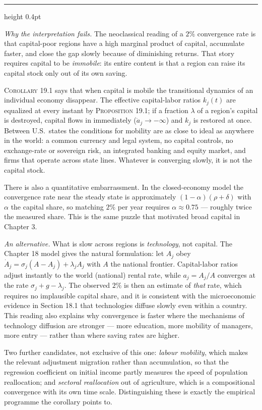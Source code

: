\documentclass[11pt,letterpaper,reqno]{amsart}
\makeatletter
\newcommand{\dt}[1]{\dot{#1}}
\newcommand{\as@head}[3]{%
  \par\addvspace{1.6ex}\penalty-200\relax
  \phantomsection
  \addcontentsline{toc}{subsection}{#1 #2\texorpdfstring{\ifx\relax#3\relax\else\quad #3\fi}{}}%
  {\color{RuleGrey}\hrule height 0.4pt}%
  \nobreak\vspace{0.8ex}\nobreak
  \noindent{\bfseries #1 #2}%
  \ifx\relax#3\relax\else\quad{\bfseries\itshape #3}\fi
  \par\nobreak\vspace{0.4ex}\nobreak
  \as@beginstatement
}
\newcommand{\as@beginstatement}{\begingroup\itshape\ignorespaces}
\newenvironment{aex}[2]{\as@head{Exercise}{#1}{#2}}{\par\addvspace{1.2ex}}
\newcommand{\bk}[1]{\textup{\textsc{#1}}}
\renewcommand{\as@beginstatement}{\ignorespaces}
\makeatother
\begin{document}
\begin{aex}{19.5}{}
\emph{Why the interpretation fails.}  The neoclassical reading of a $2\%$ convergence rate is that
capital-poor regions have a high marginal product of capital, accumulate faster, and close the gap
slowly because of diminishing returns.  That story requires capital to be \emph{immobile}:
its entire content is that a region can raise its capital stock only out of its own saving.

\bk{Corollary 19.1} says that when capital is mobile the transitional dynamics of an individual
economy disappear.  The effective capital-labor ratios $k_j(t)$ are equalized at every instant by
\bk{Proposition 19.1}; if a fraction $\lambda$ of a region's capital is destroyed, capital flows in
immediately ($\dt a_j\to-\infty$) and $k_j$ is restored at once.  Between U.S.\ states the
conditions for mobility are as close to ideal as anywhere in the world: a common currency and
legal system, no capital controls, no exchange-rate or sovereign risk, an integrated banking and
equity market, and firms that operate across state lines.  Whatever is converging slowly, it is
not the capital stock.

There is also a quantitative embarrassment.  In the closed-economy model the convergence rate
near the steady state is approximately $(1-\alpha)(\rho+\delta)$ with $\alpha$ the capital share,
so matching $2\%$ per year requires $\alpha\approx0.75$ --- roughly twice the measured share.
This is the same puzzle that motivated broad capital in Chapter 3.

\emph{An alternative.}  What is slow across regions is \emph{technology}, not capital.  The
Chapter 18 model gives the natural formulation: let $A_j$ obey
$\dt A_j=\sigma_j(A-A_j)+\lambda_jA_j$ with $A$ the national frontier.  Capital-labor ratios adjust
instantly to the world (national) rental rate, while $a_j=A_j/A$ converges at the rate
$\sigma_j+g-\lambda_j$.  The observed $2\%$ is then an estimate of \emph{that} rate, which requires
no implausible capital share, and it is consistent with the microeconomic evidence in Section 18.1
that technologies diffuse slowly even within a country.  This reading also explains why
convergence is faster where the mechanisms of technology diffusion are stronger --- more
education, more mobility of managers, more entry --- rather than where saving rates are higher.

Two further candidates, not exclusive of this one: \emph{labour mobility}, which makes the
relevant adjustment migration rather than accumulation, so that the regression coefficient on
initial income partly measures the speed of population reallocation; and \emph{sectoral
reallocation} out of agriculture, which is a compositional convergence with its own time scale.
Distinguishing these is exactly the empirical programme the corollary points to.
\end{aex}
\end{document}
